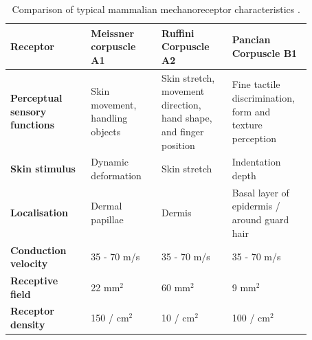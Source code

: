 \begin{table}[H]
    \centering
	\caption{Comparison of typical mammalian mechanoreceptor characteristics \cite{Roudaut2012}.}
	\label{tab:mechanoreceptors-table}
	\begin{tabular}{|p{0.24\linewidth}|p{0.21\linewidth}|p{0.21\linewidth}|p{0.21\linewidth}|} \hline
		\textbf{Receptor} & Meissner corpuscle A1 & Ruffini Corpuscle A2 & Pancian Corpuscle B1 \\ \hline
		\textbf{Perceptual   sensory functions} & Skin movement, handling objects & Skin stretch, movement direction,   hand shape, and finger position & Fine tactile discrimination, form   and texture perception \\ \hline
		\textbf{Skin stimulus} & Dynamic deformation & Skin stretch & Indentation depth \\ \hline
		\textbf{Localisation} & Dermal papillae & Dermis & Basal layer of epidermis / around   guard hair \\ \hline
		\textbf{Conduction velocity} & 35 - 70 m/s & 35 - 70 m/s & 35 - 70 m/s  \\ \hline
		\textbf{Receptive field} & 22 mm$^2$ & 60 mm$^2$ & 9 mm$^2$ \\ \hline
		\textbf{Receptor density} & 150 / cm$^2$ & 10 / cm$^2$ & 100 / cm$^2$ \\ \hline
	\end{tabular}
\end{table}


